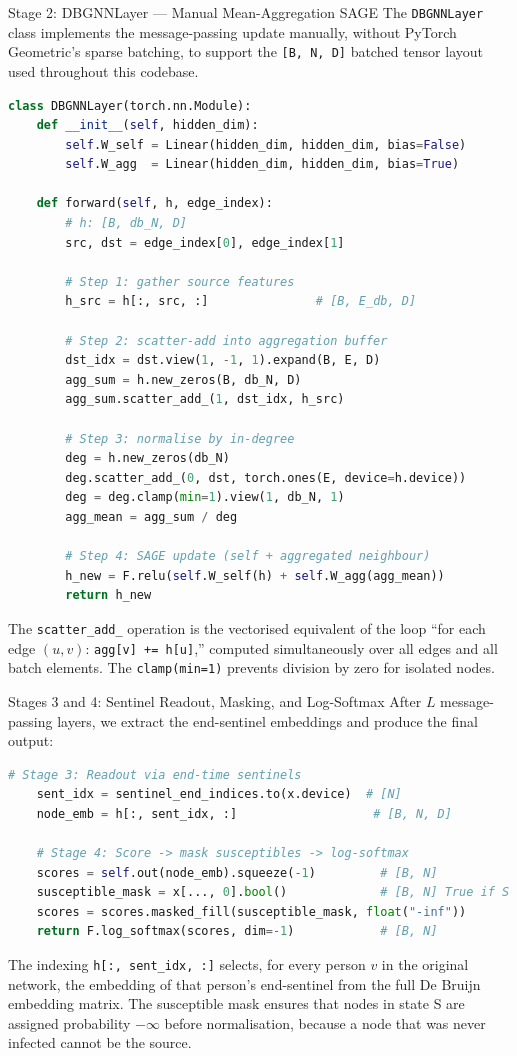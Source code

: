 \begin{codewalk}{Stage 2: DBGNNLayer --- Manual Mean-Aggregation SAGE}
The \texttt{DBGNNLayer} class implements the message-passing update manually, without PyTorch
Geometric's sparse batching, to support the \texttt{[B, N, D]} batched tensor layout used
throughout this codebase.
\begin{lstlisting}[language=Python]
class DBGNNLayer(torch.nn.Module):
    def __init__(self, hidden_dim):
        self.W_self = Linear(hidden_dim, hidden_dim, bias=False)
        self.W_agg  = Linear(hidden_dim, hidden_dim, bias=True)

    def forward(self, h, edge_index):
        # h: [B, db_N, D]
        src, dst = edge_index[0], edge_index[1]

        # Step 1: gather source features
        h_src = h[:, src, :]               # [B, E_db, D]

        # Step 2: scatter-add into aggregation buffer
        dst_idx = dst.view(1, -1, 1).expand(B, E, D)
        agg_sum = h.new_zeros(B, db_N, D)
        agg_sum.scatter_add_(1, dst_idx, h_src)

        # Step 3: normalise by in-degree
        deg = h.new_zeros(db_N)
        deg.scatter_add_(0, dst, torch.ones(E, device=h.device))
        deg = deg.clamp(min=1).view(1, db_N, 1)
        agg_mean = agg_sum / deg

        # Step 4: SAGE update (self + aggregated neighbour)
        h_new = F.relu(self.W_self(h) + self.W_agg(agg_mean))
        return h_new
\end{lstlisting}
The \texttt{scatter\_add\_} operation is the vectorised equivalent of the loop
``for each edge $(u,v)$: \texttt{agg[v] += h[u]},'' computed simultaneously over all edges
and all batch elements. The \texttt{clamp(min=1)} prevents division by zero for isolated nodes.
\end{codewalk}

\begin{codewalk}{Stages 3 and 4: Sentinel Readout, Masking, and Log-Softmax}
After $L$ message-passing layers, we extract the end-sentinel embeddings and produce the final
output:
\begin{lstlisting}[language=Python]
    # Stage 3: Readout via end-time sentinels
    sent_idx = sentinel_end_indices.to(x.device)  # [N]
    node_emb = h[:, sent_idx, :]                   # [B, N, D]

    # Stage 4: Score -> mask susceptibles -> log-softmax
    scores = self.out(node_emb).squeeze(-1)         # [B, N]
    susceptible_mask = x[..., 0].bool()             # [B, N] True if S
    scores = scores.masked_fill(susceptible_mask, float("-inf"))
    return F.log_softmax(scores, dim=-1)            # [B, N]
\end{lstlisting}
The indexing \texttt{h[:, sent\_idx, :]} selects, for every person $v$ in the original network,
the embedding of that person's end-sentinel from the full De Bruijn embedding matrix. The
susceptible mask ensures that nodes in state S are assigned probability $-\infty$ before
normalisation, because a node that was never infected cannot be the source.
\end{codewalk}

